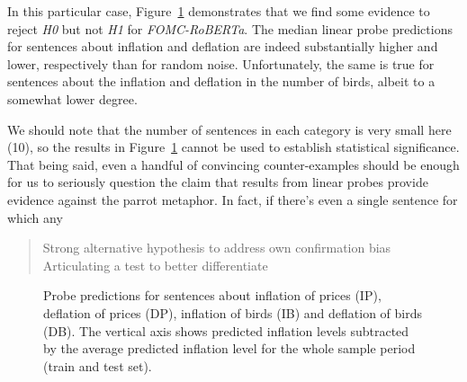 \documentclass{article}
\theoremstyle{plain}
\theoremstyle{definition}
\theoremstyle{remark}
\begin{document}
In this particular case, Figure~\ref{fig-attack} demonstrates that we
find some evidence to reject \emph{H0} but not \emph{H1} for
\emph{FOMC-RoBERTa}. The median linear probe predictions for sentences
about inflation and deflation are indeed substantially higher and lower,
respectively than for random noise. Unfortunately, the same is true for
sentences about the inflation and deflation in the number of birds,
albeit to a somewhat lower degree.

We should note that the number of sentences in each category is very
small here (10), so the results in Figure~\ref{fig-attack} cannot be
used to establish statistical significance. That being said, even a
handful of convincing counter-examples should be enough for us to
seriously question the claim that results from linear probes provide
evidence against the parrot metaphor. In fact, if there's even a single
sentence for which any

\begin{quote}
Strong alternative hypothesis to address own confirmation bias
Articulating a test to better differentiate
\end{quote}

\begin{figure}


\caption{\label{fig-attack}Probe predictions for sentences about
inflation of prices (IP), deflation of prices (DP), inflation of birds
(IB) and deflation of birds (DB). The vertical axis shows predicted
inflation levels subtracted by the average predicted inflation level for
the whole sample period (train and test set).}

\end{figure}%





\newpage
\appendix
\onecolumn
\end{document}
